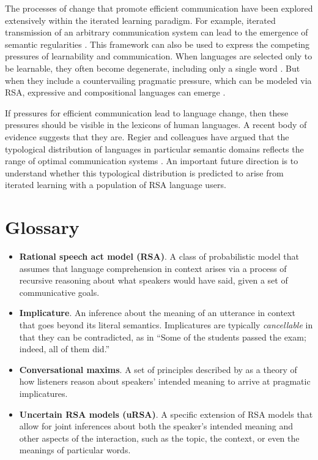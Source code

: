 \documentclass[]{elsarticle}
\begin{document}
The processes of change that promote efficient communication have been
explored extensively within the iterated learning paradigm. For example,
iterated transmission of an arbitrary communication system can lead to
the emergence of semantic regularities \citep{kirby2008}.
This framework can also be used to express the competing pressures of
learnability and communication. When languages are selected only to be
learnable, they often become degenerate, including only a single word
\citep{perfors2014}. But when they include a countervailing
pragmatic pressure, which can be modeled via RSA, expressive and compositional languages can emerge
\citep{kirby2015}.

If pressures for efficient communication lead to language change, then
these pressures should be visible in the lexicons of human languages. A
recent body of evidence suggests that they are. Regier and colleagues
have argued that the typological distribution of languages in particular
semantic domains reflects the range of optimal communication systems
\citep[e.g.,][]{regier2007,kemp2012,xu2014}.
An important future direction is to understand whether this typological distribution is predicted to arise from iterated learning with a population of RSA language users.


\section{Glossary}\label{glossary}

\begin{itemize}
\item \textbf{Rational speech act model (RSA)}. A class of probabilistic model that assumes that language comprehension in context arises via a process of
  recursive reasoning about what speakers would have said, given a set
  of communicative goals.

\item \textbf{Implicature}. An inference about the meaning of an utterance in context that goes beyond its literal semantics. Implicatures are typically \emph{cancellable} in that they can be contradicted, as in ``Some of the students passed the exam; indeed, all of them did.''

\item \textbf{Conversational maxims}. A set of principles described by \citet{grice1975} as a theory of how listeners reason about speakers' intended meaning to arrive at pragmatic implicatures.

\item \textbf{Uncertain RSA models (uRSA)}. A specific extension of RSA models that allow for joint inferences about both the speaker's intended meaning and other aspects of the interaction, such as the topic, the context, or even the meanings of particular words.

\end{itemize}
\end{document}
